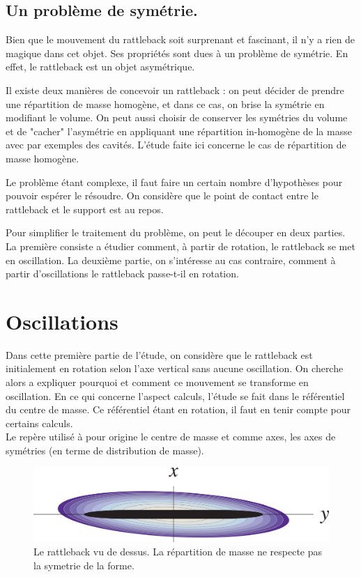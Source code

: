 \documentclass[12pt,a4paper]{article}
\begin{document}
\subsection{Un problème de symétrie.}
Bien que le mouvement du rattleback soit surprenant et fascinant, il n'y a rien de magique dans cet objet. Ses propriétés sont dues à un problème de symétrie. En effet, le rattleback est un objet asymétrique.

Il existe deux manières de concevoir un rattleback : on peut décider de prendre une répartition de masse homogène, et dans ce cas, on brise la symétrie en modifiant le volume. On peut aussi choisir de conserver les symétries du volume et de "cacher" l'asymétrie en appliquant une répartition in-homogène de la masse avec par exemples des cavités. L'étude faite ici concerne le cas de répartition de masse homogène.

Le problème étant complexe, il faut faire un certain nombre d'hypothèses pour pouvoir espérer le résoudre.
On considère que le point de contact entre le rattleback et le support est au repos.

Pour simplifier le traitement du problème, on peut le découper en deux parties.\\
La première consiste a étudier comment, à partir de rotation, le rattleback se met en oscillation. %
La deuxième partie, on s'intéresse au cas contraire, comment à partir d'oscillations le rattleback passe-t-il en rotation.
\section{Oscillations}
Dans cette première partie de l'étude, on considère que le rattleback est initialement en rotation selon l'axe vertical sans aucune oscillation. On cherche alors a expliquer pourquoi et comment ce mouvement se transforme en oscillation.
En ce qui concerne l'aspect calculs, l'étude se fait dans le référentiel du centre de masse. Ce référentiel étant en rotation, il faut en tenir compte pour certains calculs.\\
Le repère utilisé à pour origine le centre de masse et comme axes, les axes de symétries (en terme de distribution de masse).\\
\begin{figure}[h]
	\centering
	\caption{Le rattleback vu de dessus. La répartition de masse ne respecte pas la symetrie de la forme.}
	\label{fig:mass-repartition}
	\includegraphics[width=0.7\linewidth]{"mass repartition"}
\end{figure}
\end{document}
